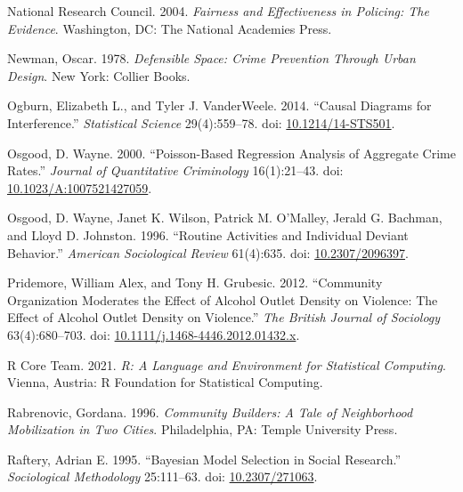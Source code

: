 \documentclass [11pt, proquest] {uwthesis}[2015/03/03]
\newlength{\cslhangindent}
\newenvironment{CSLReferences}[2]%
{\setlength{\parindent}{0pt}%
\everypar{\setlength{\hangindent}{\cslhangindent}}\ignorespaces}%
{\par}
\begin{document}
\begin{CSLReferences}{1}{0}
\leavevmode\hypertarget{ref-nationalresearchcouncilFairnessEffectivenessPolicing2004}{}%
National Research Council. 2004. \emph{Fairness and {Effectiveness} in {Policing}: {The Evidence}}. {Washington, DC}: {The National Academies Press}.

\leavevmode\hypertarget{ref-newmanDefensibleSpaceCrime1978}{}%
Newman, Oscar. 1978. \emph{Defensible {Space}: {Crime Prevention} Through {Urban Design}}. {New York}: {Collier Books}.

\leavevmode\hypertarget{ref-ogburnCausalDiagramsInterference2014}{}%
Ogburn, Elizabeth L., and Tyler J. VanderWeele. 2014. {``Causal {Diagrams} for {Interference}.''} \emph{Statistical Science} 29(4):559--78. doi: \href{https://doi.org/10.1214/14-STS501}{10.1214/14-STS501}.

\leavevmode\hypertarget{ref-osgoodPoissonBasedRegressionAnalysis2000}{}%
Osgood, D. Wayne. 2000. {``Poisson-{Based Regression Analysis} of {Aggregate Crime Rates}.''} \emph{Journal of Quantitative Criminology} 16(1):21--43. doi: \href{https://doi.org/10.1023/A:1007521427059}{10.1023/A:1007521427059}.

\leavevmode\hypertarget{ref-osgoodRoutineActivitiesIndividual1996}{}%
Osgood, D. Wayne, Janet K. Wilson, Patrick M. O'Malley, Jerald G. Bachman, and Lloyd D. Johnston. 1996. {``Routine {Activities} and {Individual Deviant Behavior}.''} \emph{American Sociological Review} 61(4):635. doi: \href{https://doi.org/10.2307/2096397}{10.2307/2096397}.

\leavevmode\hypertarget{ref-pridemoreCommunityOrganizationModerates2012}{}%
Pridemore, William Alex, and Tony H. Grubesic. 2012. {``Community {Organization Moderates} the {Effect} of {Alcohol Outlet Density} on {Violence}: {The Effect} of {Alcohol Outlet Density} on {Violence}.''} \emph{The British Journal of Sociology} 63(4):680--703. doi: \href{https://doi.org/10.1111/j.1468-4446.2012.01432.x}{10.1111/j.1468-4446.2012.01432.x}.

\leavevmode\hypertarget{ref-rcoreteamLanguageEnvironmentStatistical2021}{}%
R Core Team. 2021. \emph{R: {A} Language and Environment for Statistical Computing}. {Vienna, Austria}: {R Foundation for Statistical Computing}.

\leavevmode\hypertarget{ref-rabrenovicCommunityBuildersTale1996}{}%
Rabrenovic, Gordana. 1996. \emph{Community {Builders}: {A Tale} of {Neighborhood Mobilization} in {Two Cities}}. {Philadelphia, PA}: {Temple University Press}.

\leavevmode\hypertarget{ref-rafteryBayesianModelSelection1995}{}%
Raftery, Adrian E. 1995. {``Bayesian {Model Selection} in {Social Research}.''} \emph{Sociological Methodology} 25:111--63. doi: \href{https://doi.org/10.2307/271063}{10.2307/271063}.


\end{CSLReferences}
\end{document}
